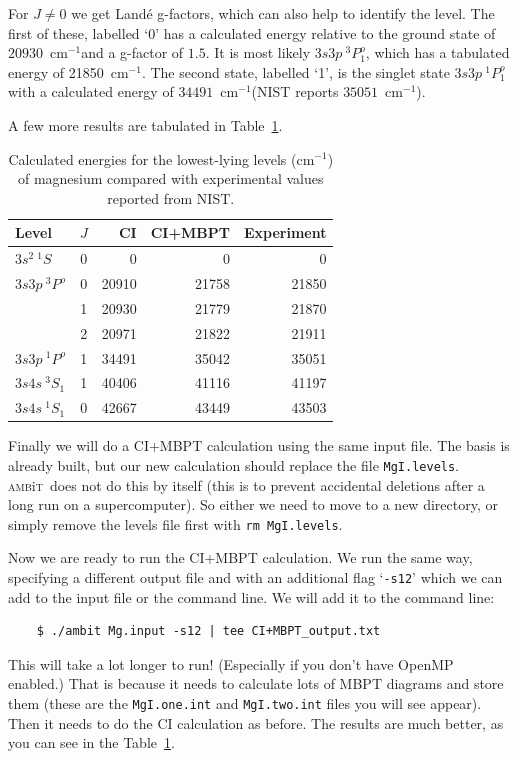 \documentclass{report}
\newcommand{\ambit}{\textsc{amb}{\footnotesize i}\textsc{t}}
\newcommand{\cm}{cm$^{-1}$}
\begin{document}
For $J \neq 0$ we get Land\'e g-factors, which can also help to identify the level. The first of these, labelled `0' has a calculated energy relative to the ground state of $20930$~\cm and a g-factor of $1.5$. It is most likely $3s3p\ ^3P^o_1$, which has a tabulated energy of 21850~\cm. The second state, labelled `1', is the singlet state $3s3p\ ^1P^o_1$ with a calculated energy of $34491$~\cm (NIST reports $35051$~\cm).

A few more results are tabulated in Table~\ref{tab:mg}.

\begin{table}[tb]
\caption{\label{tab:mg} Calculated energies for the lowest-lying levels (\cm) of magnesium compared with experimental values reported from NIST.}
\begin{tabular}{lcrrr}
\hline\hline
	Level & $J$ & CI & CI+MBPT & Experiment \\
\hline
$3s^2\ ^1\!S$ & 0 & 0 & 0 & 0 \\
$3s3p\ ^3\!P^o$ & 0 & 20910 & 21758 & 21850 \\
	& 1 & 20930 & 21779 & 21870 \\
	& 2 & 20971 & 21822 & 21911 \\
	$3s3p\ ^1\!P^o$ & 1 & 34491& 35042 & 35051 \\
	$3s4s\ ^3\!S_1$ & 1 & 40406 & 41116 & 41197 \\
	$3s4s\ ^1\!S_1$ & 0 & 42667 & 43449 & 43503 \\
\hline\hline
\end{tabular}
\end{table}

Finally we will do a CI+MBPT calculation using the same input file. The basis is already built, but our new calculation should replace the file \texttt{MgI.levels}. \ambit\ does not do this by itself (this is to prevent accidental deletions after a long run on a supercomputer). So either we need to move to a new directory, or simply remove the levels file first with
\texttt{rm MgI.levels}.

Now we are ready to run the CI+MBPT calculation. We run the same way, specifying a different output file and with an additional flag `\texttt{-s12}' which we can add to the input file or the command line. We will add it to the command line:

\begin{verbatim}
	$ ./ambit Mg.input -s12 | tee CI+MBPT_output.txt
\end{verbatim}

This will take a lot longer to run! (Especially if you don't have OpenMP enabled.) That is because it needs to calculate lots of MBPT diagrams and store them (these are the \texttt{MgI.one.int} and \texttt{MgI.two.int} files you will see appear). Then it needs to do the CI calculation as before. The results are much better, as you can see in the Table~\ref{tab:mg}.
\end{document}
